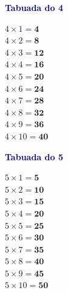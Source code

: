 \documentclass[12pt]{article}
\begin{document}
\begin{minipage}[t]{3.3cm}
\noindent\textcolor{darkblue}{\bfseries\small Tabuada do 4}\par\vspace{2pt}
{\footnotesize
$4\times1=\mathbf{4}$\\$4\times2=\mathbf{8}$\\$4\times3=\mathbf{12}$\\
$4\times4=\mathbf{16}$\\$4\times5=\mathbf{20}$\\$4\times6=\mathbf{24}$\\
$4\times7=\mathbf{28}$\\$4\times8=\mathbf{32}$\\$4\times9=\mathbf{36}$\\
$4\times10=\mathbf{40}$}
\end{minipage}\hfill
\begin{minipage}[t]{3.3cm}
\noindent\textcolor{darkblue}{\bfseries\small Tabuada do 5}\par\vspace{2pt}
{\footnotesize
$5\times1=\mathbf{5}$\\$5\times2=\mathbf{10}$\\$5\times3=\mathbf{15}$\\
$5\times4=\mathbf{20}$\\$5\times5=\mathbf{25}$\\$5\times6=\mathbf{30}$\\
$5\times7=\mathbf{35}$\\$5\times8=\mathbf{40}$\\$5\times9=\mathbf{45}$\\
$5\times10=\mathbf{50}$}
\end{minipage}
\end{document}
